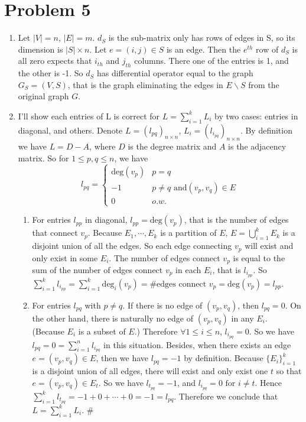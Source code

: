 \documentclass[twoside,11pt]{homework}
\begin{document}
\section*{Problem 5}
\begin{enumerate}
    \item 
    Let $|V|=n$, $|E|=m$. $d_S$ is the sub-matrix only has rows of edges in S, so its dimension is $|S|\times n$. Let $e =(i,j) \in S$ is an edge. Then the $e^{th}$ row of $d_S$ is all zero expects that $i_{th}$ and $j_{th}$ columns. There one of the entries is 1, and the other is -1.
    So $d_S$ has differential operator equal to the graph $G_S=(V,S)$, that is the graph eliminating the edges in $E\backslash S$ from the original graph $G$.
    
    \item
    I'll show each entries of L is correct for $L=\sum_{i=1}^k L_i$ by two cases: entries in diagonal, and others. Denote $L = (l_{pq})_{n\times n}$, $L_i = (l_{i_{pq}})_{n\times n}$. By definition we have $L=D-A$, where $D$ is the degree matrix and $A$ is the adjacency matrix. So for $1 \leq p,q \leq n$, we have
    \begin{equation}
        l_{pq} = 
        \begin{cases}
        \text{deg}(v_p)& p=q\\
        -1& p \neq q \text{ and} (v_p,v_q) \in E\\
        0& o.w.
        \end{cases}
    \end{equation}
    \begin{enumerate}
        \item 
        For entries $l_{pp}$ in diagonal, $l_{pp} = \text{deg}(v_p)$, that is the number of edges that connect $v_p$. Because $E_1,\cdots,E_k$ is a partition of $E$, $E = \bigcup_{i=1}^k E_k$ is a disjoint union of all the edges. So each edge connecting $v_p$ will exist and only exist in some $E_i$. The number of edges connect $v_p$ is equal to the sum of the number of edges connect $v_p$ in each $E_i$, that is $l_{i_{pp}}$. So $\sum_{i=1}^k l_{i_{pp}}=\sum_{i=1}^k \text{deg}_i (v_p)  = \# \text{edges connect }v_p = \text{deg}(v_p)=l_{pp}$.
        \item
        For entries $l_{pq}$ with $p\neq q$. If there is no edge of $(v_p, v_q)$, then $l_{pq}=0$. On the other hand, there is naturally no edge of $(v_p, v_q)$ in any $E_i$. (Because $E_i$ is a subset of $E$.) Therefore $\forall 1 \leq i \leq n$, $l_{i_{pq}}=0$. So we have $l_{pq}=0=\sum_{i=1}^n l_{i_{pq}}$ in this situation.\newline
        \newline
        Besides, when there exists an edge $e=(v_p,v_q) \in E$, then we have  $l_{pq}=-1$ by definition. Because $\{E_i\}_{i=1}^k$ is a disjoint union of all edges, there will exist and only exist one $t$ so that $e=(v_p,v_q) \in E_t$. So we have $l_{t_{pq}}=-1$, and $l_{i_{pq}}=0 \text{ for } i\neq t$. Hence $\sum_{i=1}^k l_{t_{pq}}=-1+0+\cdots+0=-1= l_{pq}$.
        \newline\newline
        Therefore we conclude that $L=\sum_{i=1}^k L_i$. \#
    \end{enumerate}
    

\end{enumerate}
\end{document}
